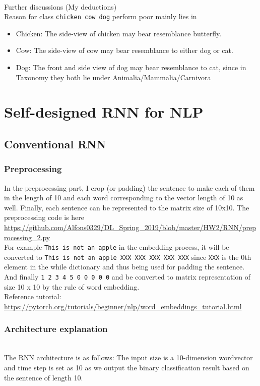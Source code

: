 \documentclass[11pt, a4paper]{article} %
\begin{document}
{\Large \\ Further discussions (My deductions)}
\\ Reason for class \texttt{chicken cow dog} perform poor mainly lies in
\begin{itemize}
    \item Chicken: The side-view of chicken may bear resemblance butterfly.
    \item Cow: The side-view of cow may bear resemblance to either dog or cat. 
    \item Dog: The front and side view of dog may bear resemblance to cat, since in Taxonomy
    they both lie under Animalia/Mammalia/Carnivora 
\end{itemize}

\section{Self-designed RNN for NLP}
\subsection{Conventional RNN}
\subsubsection{Preprocessing}
In the preprocessing part, I crop (or padding) the sentence to make each of them in the length of 10 and each word corresponding to the vector length of 10 as well.
Finally, each sentence can be represented to the matrix size of 10x10.
The preprocessing code is here \url{https://github.com/Alfons0329/DL_Spring_2019/blob/master/HW2/RNN/preprocessing_2.py}
\\ For example
\texttt{This is not an apple} in the embedding process, it will be converted to \texttt{This is not an apple XXX XXX XXX XXX XXX} since \texttt{XXX} is the 0th element in the while dictionary and thus being used for padding the sentence.
\\ And finally \texttt{1 2 3 4 5 0 0 0 0 0} and be converted to matrix representation of size 10 x 10 by the rule of word embedding.
\\ Reference tutorial: \url{https://pytorch.org/tutorials/beginner/nlp/word_embeddings_tutorial.html}
\subsubsection{Architecture explanation}
\\ The RNN architecture is as follows: The input size is a 10-dimension wordvector and time step is set as 10 as we output the binary classification result based on the sentence of length 10.
\end{document}
